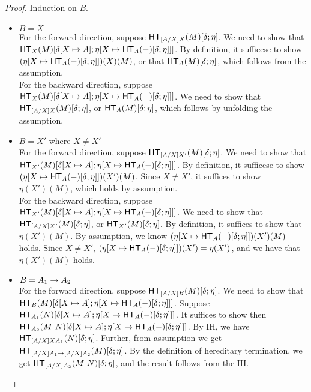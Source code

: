 \documentclass{article}
\begin{document}
\begin{proof}
Induction on $B$.
\begin{itemize}
\setlength\itemsep{1em}
\item $B = X$\\
For the forward direction, suppose $\mathsf{HT}_{[A/X]X}(M)[\delta;\eta]$. We need to show that
$\mathsf{HT}_{X}(M)[\delta[X \mapsto A];\eta[X \mapsto \mathsf{HT}_{A}(-)[\delta;\eta]]]$. By definition, it sufficese to show
$(\eta[X \mapsto \mathsf{HT}_{A}(-)[\delta;\eta]])(X)(M)$, or that $\mathsf{HT}_{A}(M)[\delta;\eta]$, which follows from the
assumption.\\

For the backward direction, suppose $\mathsf{HT}_{X}(M)[\delta[X \mapsto A];\eta[X \mapsto \mathsf{HT}_{A}(-)[\delta;\eta]]]$.
We need to show that $\mathsf{HT}_{[A/X]X}(M)[\delta;\eta]$, or $\mathsf{HT}_{A}(M)[\delta;\eta]$, which follows by unfolding
the assumption.

\item $B = X'$ where $X \ne X'$\\
For the forward direction, suppose $\mathsf{HT}_{[A/X]X'}(M)[\delta;\eta]$. We need to show that
$\mathsf{HT}_{X'}(M)[\delta[X \mapsto A];\eta[X \mapsto \mathsf{HT}_{A}(-)[\delta;\eta]]]$. By definition, it sufficese to show
$(\eta[X \mapsto \mathsf{HT}_{A}(-)[\delta;\eta]])(X')(M)$. Since $ X \ne X'$,
it suffices to show $\eta(X')(M)$, which holds by assumption. \\

For the backward direction, suppose $\mathsf{HT}_{X'}(M)[\delta[X \mapsto A];\eta[X \mapsto \mathsf{HT}_{A}(-)[\delta;\eta]]]$.
We need to show that $\mathsf{HT}_{[A/X]X'}(M)[\delta;\eta]$, or $\mathsf{HT}_{X'}(M)[\delta;\eta]$. By definition, it suffices
to show that $\eta(X')(M)$. By assumption, we know $(\eta[X \mapsto \mathsf{HT}_{A}(-)[\delta;\eta]])(X')(M)$ holds. Since
$X \ne X'$, $(\eta[X \mapsto \mathsf{HT}_{A}(-)[\delta;\eta]])(X') = \eta(X')$, and we have that $\eta(X')(M)$ holds.

\item $B = A_1 \to A_2$\\
For the forward direction, suppose $\mathsf{HT}_{[A/X]B}(M)[\delta;\eta]$. We need to show that
$\mathsf{HT}_{B}(M)[\delta[X \mapsto A];\eta[X \mapsto \mathsf{HT}_{A}(-)[\delta;\eta]]]$.
Suppose $\mathsf{HT}_{A_1}(N)[\delta[X \mapsto A];\eta[X \mapsto \mathsf{HT}_{A}(-)[\delta;\eta]]]$. It suffices to show
then $\mathsf{HT}_{A_2}(M\ N)[\delta[X \mapsto A];\eta[X \mapsto \mathsf{HT}_{A}(-)[\delta;\eta]]]$.
By IH, we have $\mathsf{HT}_{[A/X]XA_1}(N)[\delta;\eta]$. Further, from assumption we get
$\mathsf{HT}_{[A/X]A_1 \to [A/X]A_2}(M)[\delta;\eta]$. By the definition of hereditary termination, we get
$\mathsf{HT}_{[A/X]A_2}(M\ N)[\delta;\eta]$, and the result follows from the IH.


\end{itemize}
\end{proof}
\end{document}
